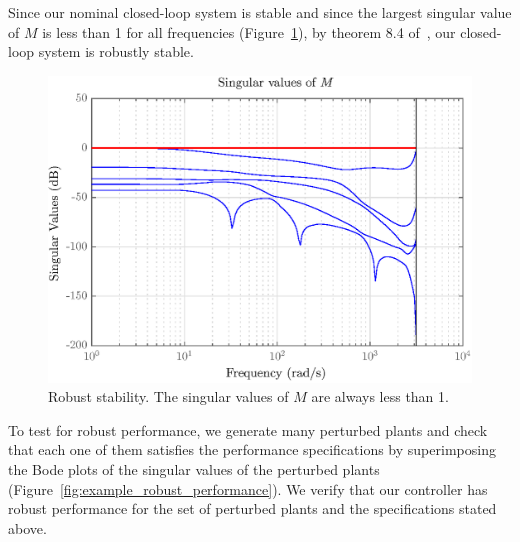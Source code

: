 \documentclass[12pt,lot, lof]{puthesis}
\begin{document}
Since our nominal closed-loop system is stable and since the largest singular value of $M$ is less than 1 for all frequencies (Figure~\ref{fig:example_robust_stability}), by theorem 8.4 of~\cite{SandP}, our closed-loop system is robustly stable.

\begin{figure}[htbp]
	\centering
	\includegraphics{chap10/robust_stability}
	\caption{Robust stability. The singular values of $M$ are always less than 1.}
	\label{fig:example_robust_stability}
\end{figure}


To test for robust performance, we generate many perturbed plants and check that each one of them satisfies the performance specifications by superimposing the Bode plots of the singular values of the perturbed plants (Figure~\ref{fig:example_robust_performance}).
We verify that our controller has robust performance for the set of perturbed plants and the specifications stated above.
\end{document}
